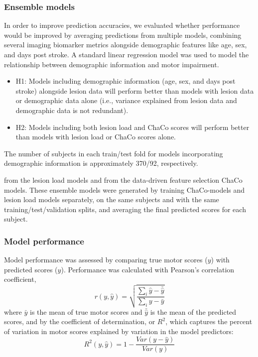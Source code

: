 \documentclass[10pt]{article}
\begin{document}
\subsubsection*{Ensemble models}
In order to improve prediction accuracies, we evaluated whether performance would be improved by averaging predictions from multiple models, combining several imaging biomarker metrics alongside demographic features like age, sex, and days post stroke. A standard linear regression model was used to model the relationship between demographic information and motor impairment. 


\begin{itemize}
\item H1: Models including demographic information (age, sex, and days post stroke) alongside lesion data will perform better than models with lesion data or demographic data alone (i.e., variance explained from lesion data and demographic data is not redundant).
\item H2: Models including both lesion load and ChaCo scores will perform better than models with lesion load or ChaCo scores alone.
\end{itemize}

 The number of subjects in each train/test fold for models incorporating demographic information is approximately 370/92, respectively.

from the lesion load models and from the data-driven feature selection ChaCo models. These ensemble models were generated by training ChaCo-models and lesion load models separately, on the same subjects and with the same training/test/validation splits, and averaging the final predicted scores for each subject. 



\subsubsection*{Model performance}
Model performance was assessed by comparing true motor scores ($y$) with predicted scores ($\hat{y}$). Performance was calculated with Pearson's correlation coefficient, 
\begin{equation}
    r(y, \hat{y}) = \sqrt{\frac{\sum_i{\hat{y}-\bar{\hat{y}}}}{\sum_i{y-\bar{y}}}}
\end{equation}
where $\bar{y}$ is the mean of true motor scores and  $\bar{\hat{y}}$ is the mean of the predicted scores, and by the coefficient of determination, or $R^2$, which captures the percent of variation in motor scores explained by variation in the model predictors:
\begin{equation}
    R^2(y, \hat{y}) = 1 - \frac{Var(y-\hat{y})}{Var(y)}
\end{equation}
\end{document}
